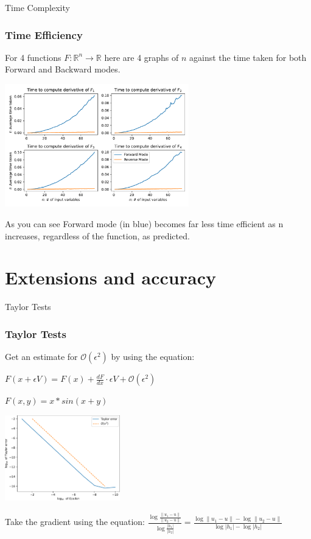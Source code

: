 \documentclass{beamer}
\begin{document}
\begin{frame}{Time Complexity}
\frametitle{Time Efficiency}
For 4 functions $F: \mathbb{R}^n \rightarrow \mathbb{R}$
here are 4 graphs of $n$ against the time taken for both Forward and Backward modes.
\begin{center}
    \includegraphics[width=8cm]{images/Graph_TimeDiff.pdf}
\end{center}

As you can see Forward mode (in blue) becomes far less time efficient as n increases, regardless of the function, as predicted.
\end{frame}


\section{Extensions and accuracy}


\begin{frame}{Taylor Tests}
\frametitle{Taylor Tests}
Get an estimate for $\mathcal{O}(\epsilon ^ 2)$ by using the equation:
\begin{center}
    $F(x + \epsilon V) = F(x) + \frac{dF}{dx} \cdot \epsilon V + \mathcal{O}(\epsilon ^ 2)$
\end{center}

\begin{center}
    $F(x, y) = x*sin(x+y)$
    
    \includegraphics[width=5cm]{images/taylor_error_1.pdf}
\end{center}

Take the gradient using the equation: $\frac{\log{\frac{\|u_1 - u\|}{\|u_2 - u\|}}}{\log{\frac{|h_1|}{|h_2|}}} = \frac{\log\|u_1 - u\| - \log\|u_2 - u\|}{\log|h_1| - \log|h_2|}$
\end{frame}
\end{document}
